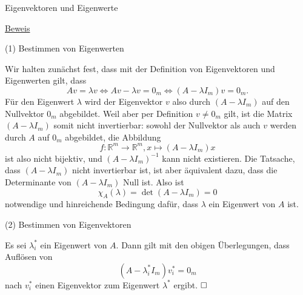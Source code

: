 \documentclass[
  8pt,
  ignorenonframetext,
]{beamer}
\begin{document}
\begin{frame}{Eigenvektoren und Eigenwerte}
\protect\hypertarget{eigenvektoren-und-eigenwerte-4}{}
\footnotesize

\underline{Beweis}

\noindent (1) Bestimmen von Eigenwerten

Wir halten zunächst fest, dass mit der Definition von Eigenvektoren und
Eigenwerten gilt, dass \begin{equation}
Av = \lambda v
\Leftrightarrow Av - \lambda v = 0_m
\Leftrightarrow (A - \lambda I_m)v = 0_m.
\end{equation} Für den Eigenwert \(\lambda\) wird der Eigenvektor \(v\)
also durch \((A - \lambda I_m)\) auf den Nullvektor \(0_m\) abgebildet.
Weil aber per Definition \(v \neq 0_m\) gilt, ist die Matrix
\((A - \lambda I_m)\) somit nicht invertierbar: sowohl der Nullvektor
als auch \(v\) werden durch \(A\) auf \(0_m\) abgebildet, die Abbildung
\begin{equation}
f : \mathbb{R}^m \to \mathbb{R}^m, x \mapsto (A - \lambda I_m)x
\end{equation} ist also nicht bijektiv, und \((A - \lambda I_m)^{-1}\)
kann nicht existieren. Die Tatsache, dass \((A - \lambda I_m)\) nicht
invertierbar ist, ist aber äquivalent dazu, dass die Determinante von
\((A -\lambda I_m)\) Null ist. Also ist \begin{equation}
\chi_A(\lambda) = \det(A - \lambda I_m) = 0
\end{equation} notwendige und hinreichende Bedingung dafür, dass
\(\lambda\) ein Eigenwert von \(A\) ist.

\noindent (2) Bestimmen von Eigenvektoren

Es sei \(\lambda_i^*\) ein Eigenwert von \(A\). Dann gilt mit den obigen
Überlegungen, dass Auflösen von \begin{equation}
(A - \lambda_i^* I_m)v_i^* = 0_m
\end{equation} nach \(v_i^*\) einen Eigenvektor zum Eigenwert
\(\lambda^*\) ergibt. \(\hfill \Box\)
\end{frame}
\end{document}
